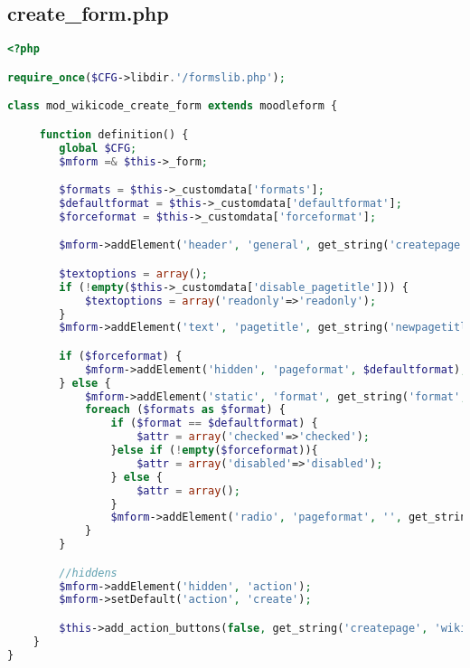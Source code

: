 \subsection{create\_form.php}
\begin{lstlisting}[language=PHP]
<?php

require_once($CFG->libdir.'/formslib.php');

class mod_wikicode_create_form extends moodleform {

     function definition() {
        global $CFG;
        $mform =& $this->_form;

        $formats = $this->_customdata['formats'];
        $defaultformat = $this->_customdata['defaultformat'];
        $forceformat = $this->_customdata['forceformat'];

        $mform->addElement('header', 'general', get_string('createpage', 'wikicode'));

        $textoptions = array();
        if (!empty($this->_customdata['disable_pagetitle'])) {
            $textoptions = array('readonly'=>'readonly');
        }
        $mform->addElement('text', 'pagetitle', get_string('newpagetitle', 'wikicode'), $textoptions);

        if ($forceformat) {
            $mform->addElement('hidden', 'pageformat', $defaultformat);
        } else {
            $mform->addElement('static', 'format', get_string('format', 'wikicode'));
            foreach ($formats as $format) {
                if ($format == $defaultformat) {
                    $attr = array('checked'=>'checked');
                }else if (!empty($forceformat)){
                    $attr = array('disabled'=>'disabled');
                } else {
                    $attr = array();
                }
                $mform->addElement('radio', 'pageformat', '', get_string('format'.$format, 'wikicode'), $format, $attr);
            }
        }

        //hiddens
        $mform->addElement('hidden', 'action');
        $mform->setDefault('action', 'create');

        $this->add_action_buttons(false, get_string('createpage', 'wikicode'));
    }
}
\end{lstlisting}

